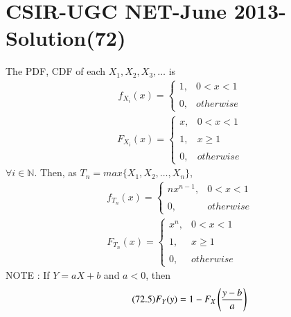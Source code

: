 \documentclass[journal,12pt,twocolumn]{IEEEtran}
\begin{document}
\section*{CSIR-UGC NET-June 2013-Solution(72)}
The PDF, CDF of each $X_{1},X_{2},X_{3},\dots$ is 
\begin{align}
\tag{72.1}
    f_{X_{i}}(x)=\begin{cases}
	1, & 0< x<1 \\~\\[-1em]
	0, & otherwise
	\end{cases} 
\end{align}
\begin{align}
\tag{72.2}
	F_{X_{i}}(x)=\begin{cases}
	x, & 0< x<1 \\~\\[-1em]
	1, & x\geq 1\\~\\[-1em]
	0, & otherwise
	\end{cases} 
\end{align}
$\forall i\in \mathbb{N}$.
Then, as $T_{n}=max\{ X_{1},X_{2},\dots,X_{n}\}$,
\begin{align}
\tag{72.3}
    f_{T_{n}}(x)=\begin{cases}
	nx^{n-1}, & 0< x<1 \\~\\[-1em]
	0, & otherwise
	\end{cases} \\
\tag{72.4}
	F_{T_{n}}(x)=\begin{cases}
	x^{n}, & 0< x<1 \\~\\[-1em]
	1, & x\geq 1\\~\\[-1em]
	0, & otherwise
	\end{cases} 
\end{align}
NOTE : If $Y=aX+b$ and $a<0$, then
\begin{align}
\tag{72.5}
\label{eq:form}
    F_{Y}(y)=1-F_{X}\left(\dfrac{y-b}{a}\right)
\end{align}
\end{document}
